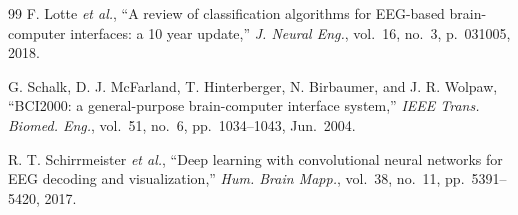 \documentclass[11pt,a4paper]{article}
\begin{document}
\begin{thebibliography}{99}
F. Lotte \emph{et al.},
``A review of classification algorithms for EEG-based brain-computer
interfaces: a 10 year update,''
\emph{J. Neural Eng.}, vol.~16, no.~3, p.~031005, 2018.

G. Schalk, D. J. McFarland, T. Hinterberger, N. Birbaumer, and J. R. Wolpaw,
``BCI2000: a general-purpose brain-computer interface system,''
\emph{IEEE Trans. Biomed. Eng.}, vol.~51, no.~6, pp.~1034--1043, Jun.~2004.

R. T. Schirrmeister \emph{et al.},
``Deep learning with convolutional neural networks for EEG decoding and
visualization,''
\emph{Hum. Brain Mapp.}, vol.~38, no.~11, pp.~5391--5420, 2017.

\end{thebibliography}
\end{document}
